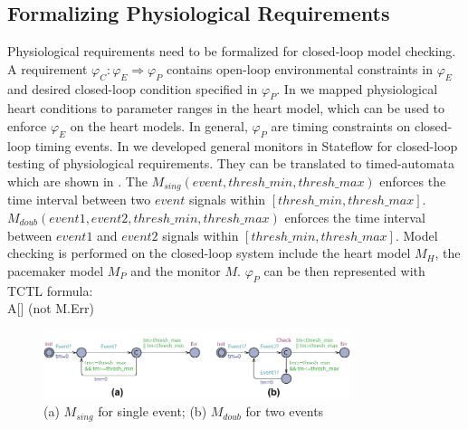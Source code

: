 \subsection{Formalizing Physiological Requirements}
%
%
Physiological requirements need to be formalized for closed-loop model checking. A requirement $\varphi_C: \varphi_E\Rightarrow \varphi_P$ contains open-loop environmental constraints in $\varphi_E$ and desired closed-loop condition specified in $\varphi_P$. In \cite{iccps10} we mapped physiological heart conditions to parameter ranges in the heart model, which can be used to enforce $\varphi_E$ on the heart models. In general, $\varphi_P$ are timing constraints on closed-loop timing events. In \cite{iccps10} we developed general monitors in Stateflow for closed-loop testing of physiological requirements. They can be translated to timed-automata which are shown in . The $M_{sing}(event,thresh\_min,thresh\_max)$ enforces the time interval between two $event$ signals within $[thresh\_min,thresh\_max]$. $M_{doub}(event1,event2,thresh\_min,thresh\_max)$ enforces the time interval between $event1$ and $event2$ signals within $[thresh\_min,thresh\_max]$. Model checking is performed on the closed-loop system include the heart model $M_H$, the pacemaker model $M_P$ and the monitor $M$. $\varphi_P$ can be then represented with TCTL formula:\\
 \textsf{A[] (not M.Err)}
\begin{figure}[!b]
		\centering
		\includegraphics[width=0.8\textwidth]{figs/monitor.pdf}
		\caption{\small (a) $M_{sing}$ for single event; (b) $M_{doub}$ for two events}
		\label{fig:monitor}
\end{figure}
%